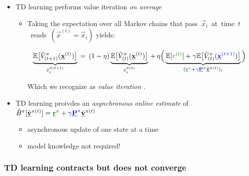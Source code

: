 \begin{frame}\frametitle{\subsubsecname}

\begin{itemize}
	\item TD learning performs value iteration \emph{on average}
		\vspace{1mm}
		
		\begin{itemize}
			\item Taking the expectation over all Markov chains 
			that pass~$\vec x_i$~at~time~$t$~reads~$(\vec x^{(t)} = \vec x_i)$ yields:
			
			\begin{equation}
		\underbrace{\E\big\lbrack\tilde V^\pi_{(t+1)}(\vec x^{(t)})\big\rbrack
			}_{\tilde v_i^{\pi(t+1)}}
		\,=\, 
		(1 - \lr)\underbrace{\E\big\lbrack \tilde V^\pi_{(t)}(\vec x^{(t)}) \big\rbrack
			}_{\tilde v_i^{\pi(t)}}
		\,+\, \lr \Big( \underbrace{\E\lbrack{\color{reward} r^{(t)}}\rbrack
		+ \gamma \E\big\lbrack\tilde V^\pi_{(t)}({\color{trans}\vec x^{(t+1)}})\big\rbrack
		}_{({\color{reward} \vec r^\pi} 
			+ \gamma {\color{trans} \vec P^\pi} \tilde{\vec v}^{\pi(t)})_i}\Big)
			\end{equation}
			
		Which we recognize as \emph{value iteration} .
			
		\end{itemize}
	
	
	\vspace{2mm}
	\item TD learning proivdes an {\em asynchronous online estimate} of 
			$\hat B^\pi[\tilde{\vec v}^{\pi(t)}] = {\color{reward}\vec r^\pi} 
			+ \gamma {\color{trans}\vec P^\pi} \tilde{\vec v}^{\pi(t)}$
		\vspace{1mm}
		\begin{itemize}
			\item asynchronous update of one state at a time
					\vspace{1mm}
			\item model knowledge not required!
		\end{itemize}

	\end{itemize}

\end{frame}

\newpage

\subsubsection{TD learning contracts but does not converge}

